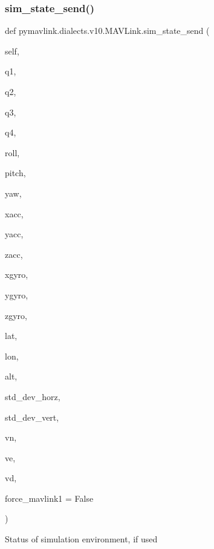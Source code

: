 \begin{DoxyVerb}
\begin{DoxyVerb}
\begin{DoxyVerb}
\begin{DoxyVerb}
\begin{DoxyVerb}
\begin{DoxyVerb}
\begin{DoxyVerb}
\begin{DoxyVerb}
\begin{DoxyVerb}
\begin{DoxyVerb}
\subsubsection{\texorpdfstring{sim\+\_\+state\+\_\+send()}{sim\_state\_send()}}
{\footnotesize\ttfamily def pymavlink.\+dialects.\+v10.\+M\+A\+V\+Link.\+sim\+\_\+state\+\_\+send (\begin{DoxyParamCaption}\item[{}]{self,  }\item[{}]{q1,  }\item[{}]{q2,  }\item[{}]{q3,  }\item[{}]{q4,  }\item[{}]{roll,  }\item[{}]{pitch,  }\item[{}]{yaw,  }\item[{}]{xacc,  }\item[{}]{yacc,  }\item[{}]{zacc,  }\item[{}]{xgyro,  }\item[{}]{ygyro,  }\item[{}]{zgyro,  }\item[{}]{lat,  }\item[{}]{lon,  }\item[{}]{alt,  }\item[{}]{std\+\_\+dev\+\_\+horz,  }\item[{}]{std\+\_\+dev\+\_\+vert,  }\item[{}]{vn,  }\item[{}]{ve,  }\item[{}]{vd,  }\item[{}]{force\+\_\+mavlink1 = {\ttfamily False} }\end{DoxyParamCaption})}

\begin{DoxyVerb}Status of simulation environment, if used


\end{DoxyVerb}
\end{DoxyVerb}
\end{DoxyVerb}
\end{DoxyVerb}
\end{DoxyVerb}
\end{DoxyVerb}
\end{DoxyVerb}
\end{DoxyVerb}
\end{DoxyVerb}
\end{DoxyVerb}
\end{DoxyVerb}
